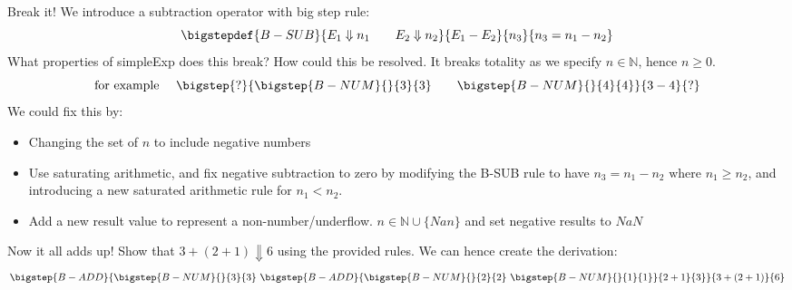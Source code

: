 \begin{examplebox}{Break it!}
    We introduce a subtraction operator with big step rule:
	\[\bigstepdef{B-SUB}{E_1 \Downarrow n_1 \qquad E_2 \Downarrow n_2}{E_1 - E_2}{n_3}{n_3 = n_1 - n_2}\]
    What properties of simpleExp does this break? How could this be resolved.
	\tcblower
	It breaks totality as we specify $n \in \mathbb{N}$, hence $n \geq 0$.
	\[\text{for example } \quad \bigstep{?}{\bigstep{B-NUM}{}{3}{3} \qquad \bigstep{B-NUM}{}{4}{4}}{3 - 4}{?}\] 
	We could fix this by:
	\begin{itemize}
		\item Changing the set of $n$ to include negative numbers
		\item Use saturating arithmetic, and fix negative subtraction to zero by modifying the B-SUB rule to have $n_3 = n_1 - n_2 \text{ where } n_1 \geq n_2$, and introducing a new saturated arithmetic rule for $n_1 < n_2$.
		\item Add a new result value to represent a non-number/underflow. $n \in \mathbb{N} \cup \{ Nan \}$ and set negative results to $NaN$
	\end{itemize}
\end{examplebox}

\begin{examplebox}{Now it all adds up!}
    Show that $3 + (2 + 1) \Downarrow 6$ using the provided rules.
    \tcblower
    We can hence create the derivation:
    \[\bigstep{B-ADD}{
        \bigstep{B-NUM}{}{3}{3} \ \bigstep{B-ADD}{
            \bigstep{B-NUM}{}{2}{2} \ \bigstep{B-NUM}{}{1}{1}
        }{2 + 1}{3}
    }{3 + (2 + 1)}{6}\] 
\end{examplebox}

